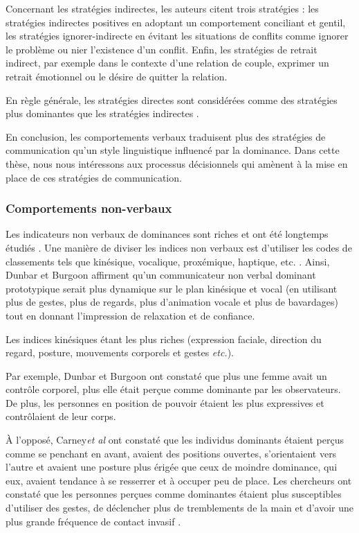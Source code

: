 			Concernant les stratégies indirectes, les auteurs citent trois stratégies : les stratégies indirectes positives en adoptant un comportement conciliant et gentil, les stratégies ignorer-indirecte en évitant les situations de conflits comme ignorer le problème ou nier l'existence d'un conflit. Enfin, les stratégies de retrait indirect, par exemple dans le contexte d'une relation de couple, exprimer un retrait émotionnel ou le désire de quitter la relation. 
			
			En règle générale, les stratégies directes sont considérées comme des stratégies plus dominantes que les stratégies indirectes \cite{dunbar2005perceptions}.
			
			En conclusion, les comportements verbaux traduisent plus des stratégies de communication qu'un style linguistique influencé par la dominance. Dans cette thèse, nous nous intéressons aux processus décisionnels qui amènent à la mise en place de ces stratégies de communication.
			 
				
			\subsubsection{Comportements non-verbaux}
			
				Les indicateurs non verbaux de dominances sont riches et ont été longtemps étudiés \cite{burgoon1995interpersonal,burgoon1998nature}. Une manière de diviser les indices non verbaux est d'utiliser les codes de classements tels que kinésique, vocalique, proxémique, haptique, etc. \cite{burgoon2006nonverbal}. Ainsi, Dunbar et Burgoon \cite{dunbar2005perceptions} affirment qu'un communicateur non verbal dominant prototypique serait plus dynamique sur le plan kinésique et vocal (en utilisant plus de gestes, plus de regards, plus d'animation vocale et plus de bavardages) tout en donnant l'impression de relaxation et de confiance.
				
				Les indices kinésiques étant les plus riches (expression faciale, direction du regard, posture, mouvements corporels et gestes \emph{etc.}).
				
				Par exemple, Dunbar et Burgoon \cite{dunbar2005perceptions} ont constaté que plus une femme avait un contrôle corporel, plus elle était perçue comme dominante par les observateurs. De plus, les personnes en position de pouvoir  étaient les plus expressives et  contrôlaient de leur corps.
				
				À l'opposé,  Carney\emph{et al}\cite{hall2005nonverbal} ont constaté que les individus dominants étaient perçus comme se penchant en avant, avaient des positions ouvertes, s'orientaient vers l'autre et avaient une posture plus érigée que ceux de moindre dominance, qui eux, avaient tendance à se resserrer et à occuper peu de place. Les chercheurs ont constaté que les personnes perçues comme dominantes étaient plus susceptibles d'utiliser des gestes, de déclencher plus de tremblements de la main et d'avoir une plus grande fréquence de contact invasif \cite{hall2005nonverbal}.
				
